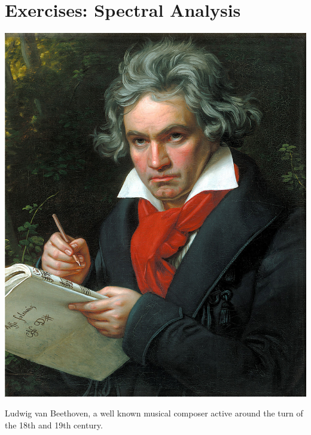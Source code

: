 \newpage
\section{Exercises: Spectral Analysis}

\begin{marginfigure}
  \begin{center}
    \includegraphics[height=0.25\textheight]{ch16/figures/Beethoven.jpg}
  \end{center}
  \caption{Ludwig van Beethoven, a well known musical composer active around the turn of the 18th and 19th century.}
  \label{fig:beet}
\end{marginfigure}

